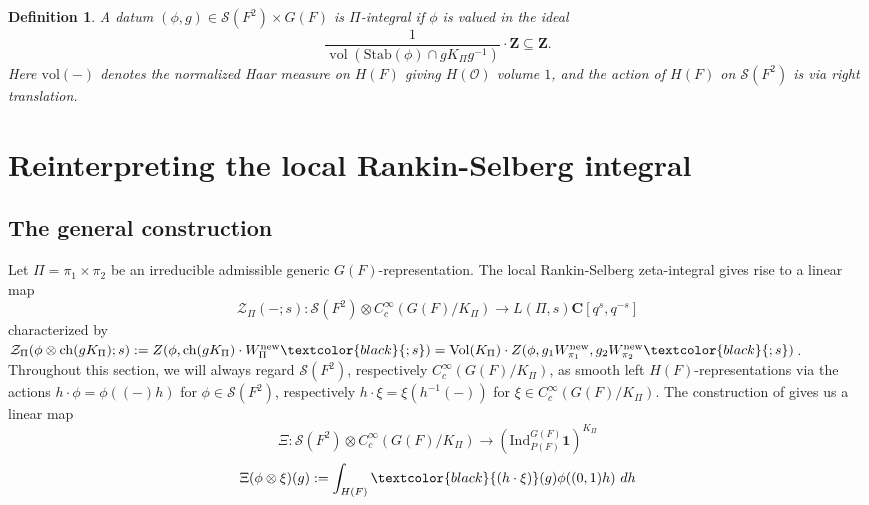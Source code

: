 \documentclass{amsart}
\theoremstyle{plain}
\theoremstyle{plain}
\newtheorem{defn}[thm]{Definition}
\theoremstyle{remark}
\DeclareMathOperator{\ch}{ch}
\DeclareMathOperator{\vol}{vol}
\begin{document}
\begin{defn}\label{def integral datum}
 A datum $ (\phi,g)\in\mathcal{S}(F^2) \times G(F)$ is $\Pi$-\textit{integral} if $\phi$ is valued in the ideal
    $$\frac{1}{\vol(\mathrm{Stab}(\phi)\cap gK_\Pi g^{-1})}\cdot\mathbf{Z}\subseteq\mathbf{Z}.$$
    \noindent Here $\mathrm{vol}(-)$ denotes the normalized Haar measure on $H(F)$ giving $H(\mathcal{O})$ volume $1$, and the action of $H(F)$ on $\mathcal{S}(F^2)$ is via right translation.
\end{defn}
\section{Reinterpreting the local Rankin-Selberg integral}\label{sec 3}
\subsection{The general construction}\label{sec: general construction}
Let $\Pi=\pi_1\times\pi_2$ be an irreducible admissible generic $G(F)$-representation. The local Rankin-Selberg zeta-integral gives rise to a linear map
$$\mathcal{Z}_\Pi(-;s):\mathcal{S}(F^2)\otimes C_c^\infty(G(F)/K_\Pi)\longrightarrow L(\Pi,s)\mathbf{C}[q^s,q^{-s}]$$
characterized by $\mathcal{Z}_\Pi(\phi\otimes \ch(gK_\Pi);s):=Z(\phi,\ch(gK_\Pi)\cdot W_\Pi^\mathrm{new}\textcolor{black}{;s})=\mathrm{Vol}(K_\Pi)\cdot Z(\phi,g_1W_{\pi_1}^\mathrm{new},g_2W_{\pi_2}^\mathrm{new}\textcolor{black}{;s})$. Throughout this section, we will always regard 
 $\mathcal{S}(F^2)$, respectively $C_c^\infty(G(F)/K_\Pi)$, as smooth left $H(F)$-representations via the actions $h\cdot\phi=\phi((-)h)$ for $\phi\in\mathcal{S}(F^2)$, respectively $h\cdot \xi=\xi(h^{-1}(-))$ for $\xi\in C_c^\infty(G(F)/K_\Pi)$. The construction of \cite[\S $3$]{groutides2024rankinselbergintegralstructureseuler} gives us a linear map $$\Xi:\mathcal{S}(F^2)\otimes C_c^\infty(G(F)/K_\Pi)\longrightarrow \left(\mathrm{Ind}_{P(F)}^{G(F)}\mathbf{1}\right)^{K_\Pi}$$
$$\Xi(\phi\otimes \xi)(g):=\int_{H(F)}\textcolor{black}{(h\cdot\xi)}(g)\phi((0,1)h)\ dh$$
\end{document}
